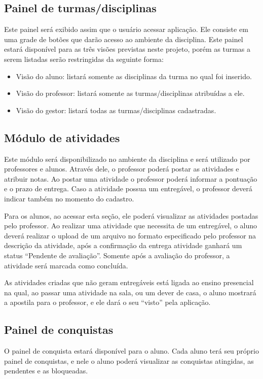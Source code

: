 \subsection{Painel de turmas/disciplinas}
Este painel será exibido assim que o usuário acessar aplicação. Ele consiste em uma grade de botões que darão acesso ao ambiente da disciplina. Este painel estará disponível para as três visões previstas neste projeto, porém as turmas a serem listadas serão restringidas da seguinte forma:
\begin{itemize}
\item Visão do aluno: listará somente as disciplinas da turma no qual foi inserido.
\item Visão do professor: listará somente as turmas/disciplinas atribuídas a ele.
\item Visão do gestor: listará todas as turmas/disciplinas cadastradas.
\end{itemize}

\subsection{Módulo de atividades}
Este módulo será disponibilizado no ambiente da disciplina e será utilizado por professores e alunos. Através dele, o professor poderá postar as atividades e atribuir notas. Ao postar uma atividade o professor poderá informar a pontuação e o prazo de entrega. Caso a atividade possua um entregável, o professor deverá indicar também no momento do cadastro.

Para os alunos, ao acessar esta seção, ele poderá visualizar as atividades postadas pelo professor. Ao realizar uma atividade que necessita de um entregável, o aluno deverá realizar o upload de um arquivo no formato especificado pelo professor na descrição da atividade, após a confirmação da entrega atividade ganhará um status “Pendente de avaliação”. Somente após a avaliação do professor, a atividade será marcada como concluída.

As atividades criadas que não geram entregáveis está ligada ao ensino presencial na qual, ao passar uma atividade na sala, ou um dever de casa, o aluno mostrará a apostila para o professor, e ele dará o seu “visto” pela aplicação. 
\subsection{Painel de conquistas}
O painel de conquista estará disponível para o aluno. Cada aluno terá seu próprio painel de conquistas, e nele o aluno poderá visualizar as conquistas atingidas, as pendentes e as bloqueadas. 

